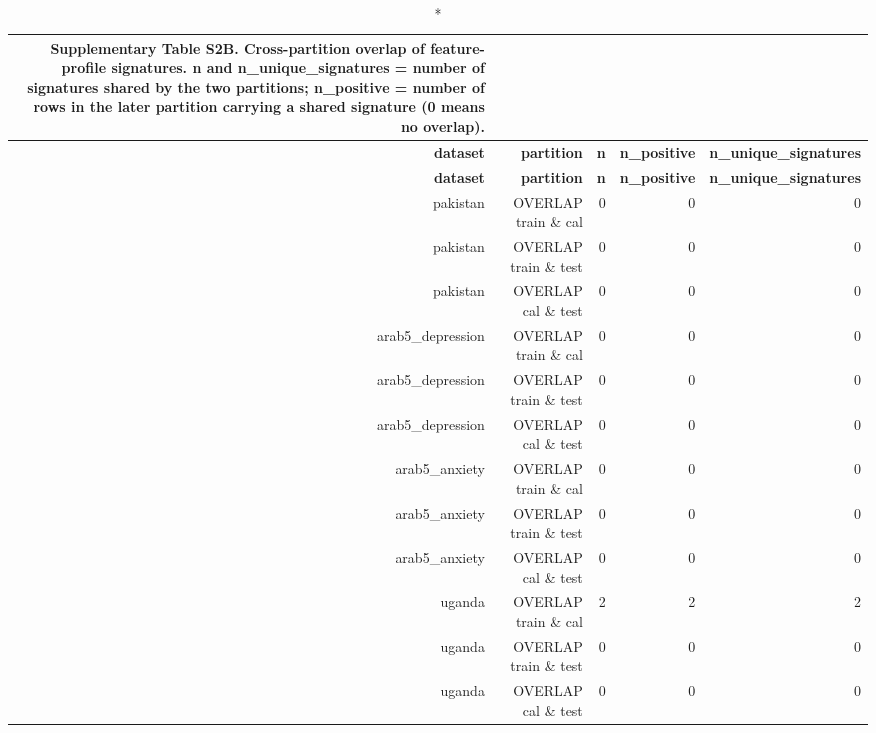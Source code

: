 \documentclass[10pt]{article}
\begin{document}
\tiny
\setlength{\tabcolsep}{2pt}
\begin{longtable}{rrrrr}
\caption*{\textbf{Supplementary Table S2B.} Cross-partition overlap of feature-profile signatures. n and n\_unique\_signatures = number of signatures shared by the two partitions; n\_positive = number of rows in the later partition carrying a shared signature (0 means no overlap).}\\
\toprule
\textbf{dataset} & \textbf{partition} & \textbf{n} & \textbf{n\_positive} & \textbf{n\_unique\_signatures} \\
\midrule
\endfirsthead
\toprule
\textbf{dataset} & \textbf{partition} & \textbf{n} & \textbf{n\_positive} & \textbf{n\_unique\_signatures} \\
\midrule
\endhead
\bottomrule
\endfoot
pakistan & OVERLAP train \& cal & 0 & 0 & 0 \\
pakistan & OVERLAP train \& test & 0 & 0 & 0 \\
pakistan & OVERLAP cal \& test & 0 & 0 & 0 \\
arab5\_depression & OVERLAP train \& cal & 0 & 0 & 0 \\
arab5\_depression & OVERLAP train \& test & 0 & 0 & 0 \\
arab5\_depression & OVERLAP cal \& test & 0 & 0 & 0 \\
arab5\_anxiety & OVERLAP train \& cal & 0 & 0 & 0 \\
arab5\_anxiety & OVERLAP train \& test & 0 & 0 & 0 \\
arab5\_anxiety & OVERLAP cal \& test & 0 & 0 & 0 \\
uganda & OVERLAP train \& cal & 2 & 2 & 2 \\
uganda & OVERLAP train \& test & 0 & 0 & 0 \\
uganda & OVERLAP cal \& test & 0 & 0 & 0 \\
\bottomrule
\end{longtable}
\normalsize
\end{document}
